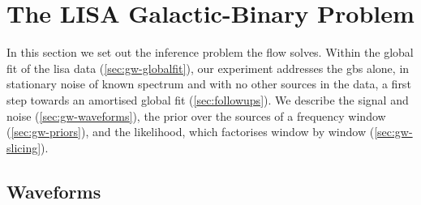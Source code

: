 \section{The LISA Galactic-Binary Problem}
\label{sec:gw}

In this section we set out the inference problem the flow solves. Within the global fit of the
\ac{lisa} data (\cref{sec:gw-globalfit}), our experiment addresses the \acp{gb} alone, in stationary
noise of known spectrum and with no other sources in the data, a first step towards an amortised
global fit (\cref{sec:followups}). We describe the signal and noise (\cref{sec:gw-waveforms}), the
prior over the sources of a frequency window (\cref{sec:gw-priors}), and the likelihood, which
factorises window by window (\cref{sec:gw-slicing}).

\subsection{Waveforms}
\label{sec:gw-data}\label{sec:gw-waveforms}

